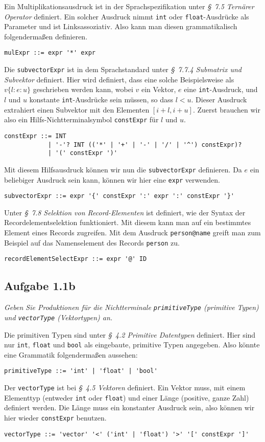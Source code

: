 \documentclass[
  ngerman,
  DIV=14
]{scrartcl}
\begin{document}
\bigskip\noindent
Ein Multiplikationsausdruck ist in der Sprachspezifikation unter \emph{§~7.5 Ternärer Operator} definiert. Ein solcher Ausdruck nimmt \verb|int| oder \verb|float|-Ausdrücke als Parameter und ist Linksassoziativ. Also kann man diesen grammatikalisch folgendermaßen definieren. 
\begin{lstlisting}
mulExpr ::= expr '*' expr
\end{lstlisting}
Die \verb|subvectorExpr| ist in dem Sprachstandard unter \emph{§~7.7.4 Submatrix und Subvektor} definiert. Hier wird definiert, dass eine solche Beispielsweise als $v\{l:e:u\}$ geschrieben werden kann, wobei $v$ ein Vektor, $e$ eine \texttt{int}-Ausdruck, und $l$ und $u$ konstante \texttt{int}-Ausdrücke sein müssen, so dass $l < u$. Dieser Ausdruck extrahiert einen Subvektor mit den Elementen $[i+l, i+u]$. Zuerst brauchen wir also ein Hilfs-Nichtterminalsymbol \texttt{constExpr} für $l$ und $u$.
\begin{lstlisting}
constExpr ::= INT
            | '-'? INT (('*' | '+' | '-' | '/' | '^') constExpr)?
            | '(' constExpr ')'
\end{lstlisting}
Mit diesem Hilfsausdruck können wir nun die \texttt{subvectorExpr} definieren. Da $e$ ein beliebiger Ausdruck sein kann, können wir hier eine \texttt{expr} verwenden. 
\begin{lstlisting}
subvectorExpr ::= expr '{' constExpr ':' expr ':' constExpr '}'  
\end{lstlisting}
Unter \emph{§~7.8 Selektion von Record-Elementen} ist definiert, wie der Syntax der Recordelementselektion funktioniert. Mit diesem kann man auf ein bestimmtes Element eines Records zugreifen. Mit dem Ausdruck \texttt{person@name} greift man zum Beispiel auf das Namenselement des Records \texttt{person} zu. 
\begin{lstlisting}
recordElementSelectExpr ::= expr '@' ID  
\end{lstlisting}

\subsection*{Aufgabe 1.1b}

\emph{Geben Sie Produktionen für die Nichtterminale \texttt{primitiveType} (primitive Typen) und \texttt{vectorType} (Vektortypen) an.}

\bigskip\noindent
Die primitiven Typen sind unter \emph{§~4.2 Primitive Datentypen} definiert. Hier sind nur \texttt{int}, \texttt{float} und \texttt{bool} als eingebaute, primitive Typen angegeben. Also könnte eine Grammatik folgendermaßen aussehen:
\begin{lstlisting}
primitiveType ::= 'int' | 'float' | 'bool'
\end{lstlisting}
Der \texttt{vectorType} ist bei \emph{§~4.5 Vektoren} definiert. Ein Vektor muss, mit einem Elementtyp (entweder \texttt{int} oder \texttt{float}) und einer Länge (positive, ganze Zahl) definiert werden. Die Länge muss ein konstanter Ausdruck sein, also können wir hier wieder \texttt{constExpr} benutzen.
\begin{lstlisting}
vectorType ::= 'vector' '<' ('int' | 'float') '>' '[' constExpr ']'
\end{lstlisting}
\end{document}
